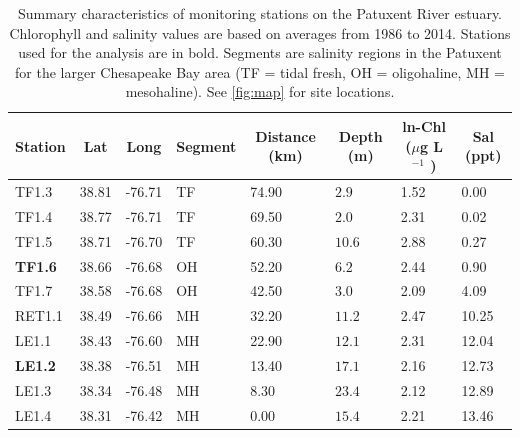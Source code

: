 \documentclass[letterpaper,12pt,oneside]{article}\usepackage[]{graphicx}\usepackage[]{color}
\newcommand{\mugl}{$\mu$g L$^{-1}$ }
\begin{document}
\clearpage
\begin{singlespace}


\end{singlespace}
\clearpage


\begin{table}[!tbp]
\caption{Summary characteristics of monitoring stations on the Patuxent River estuary.  Chlorophyll and salinity values are based on averages from 1986 to 2014.  Stations used for the analysis are in bold.  Segments are salinity regions in the Patuxent for the larger Chesapeake Bay area (TF = tidal fresh, OH = oligohaline, MH = mesohaline).  See \cref{fig:map} for site locations.\label{tab:statsum}} 
\begin{center}
\begin{tabular}{llllllll}
\hline\hline
\multicolumn{1}{l}{Station}&\multicolumn{1}{c}{Lat}&\multicolumn{1}{c}{Long}&\multicolumn{1}{c}{Segment}&\multicolumn{1}{c}{Distance (km)}&\multicolumn{1}{c}{Depth (m)}&\multicolumn{1}{c}{ln-Chl (\mugl)}&\multicolumn{1}{c}{Sal (ppt)}\tabularnewline
\hline
TF1.3&38.81&-76.71&TF&74.90&$ 2.9$&1.52& 0.00\tabularnewline
TF1.4&38.77&-76.71&TF&69.50&$ 2.0$&2.31& 0.02\tabularnewline
TF1.5&38.71&-76.70&TF&60.30&$10.6$&2.88& 0.27\tabularnewline
{\bf TF1.6}&38.66&-76.68&OH&52.20&$ 6.2$&2.44& 0.90\tabularnewline
TF1.7&38.58&-76.68&OH&42.50&$ 3.0$&2.09& 4.09\tabularnewline
RET1.1&38.49&-76.66&MH&32.20&$11.2$&2.47&10.25\tabularnewline
LE1.1&38.43&-76.60&MH&22.90&$12.1$&2.31&12.04\tabularnewline
{\bf LE1.2}&38.38&-76.51&MH&13.40&$17.1$&2.16&12.73\tabularnewline
LE1.3&38.34&-76.48&MH& 8.30&$23.4$&2.12&12.89\tabularnewline
LE1.4&38.31&-76.42&MH& 0.00&$15.4$&2.21&13.46\tabularnewline
\hline
\end{tabular}\end{center}

\end{table}
\end{document}
